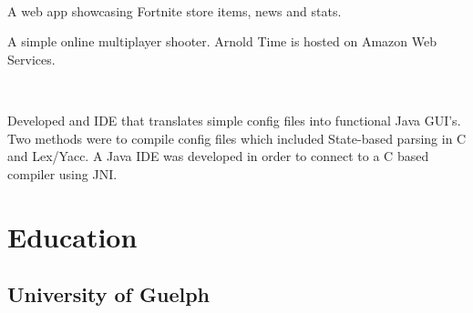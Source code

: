 \documentclass[]{chris_katsaras_resume}
\begin{document}
\begin{minipage}[t]{1\textwidth}
\sectionsep

\\
\vspace{1mm}
\begin{tightemize}
\item A web app showcasing Fortnite store items, news and stats.
\end{tightemize}

\sectionsep

\vspace{1mm}
\begin{tightemize}
\item A simple online multiplayer shooter. Arnold Time is hosted on Amazon Web Services.
\end{tightemize}

\sectionsep

\\
\vspace{1mm}
\begin{tightemize}
\item Developed and IDE that translates simple config files into functional Java GUI’s. Two methods were to compile config files which included State-based parsing in C and Lex/Yacc. A Java IDE was developed in order to connect to a C based compiler using JNI.
\end{tightemize}

\sectionsep

\section{Education} 

\subsection{University of Guelph}
\sectionsep



\end{minipage}
\end{document}
